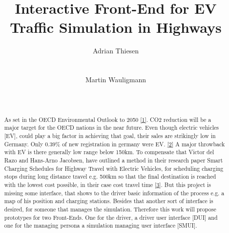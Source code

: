 \documentclass[hidelinks]{sig-alternate}
\begin{document}
\title{Interactive Front-End for EV Traffic Simulation in Highways}



\author{
\alignauthor Adrian Thiesen\\
       \\
       \\
\alignauthor Martin Wauligmann\\
       \\
       \\
}


\maketitle


\begin{abstract}

As set in the OECD Environmental Outlook to 2050 \href{https://www.oecd.org/env/cc/49082173.pdf}{[1]}. CO2 reduction
will be a major target for the OECD nations in the near future. Even though electric vehicles [EV], could play a big
factor in achieving that goal, their sales are strikingly low in Germany. Only 0.39\% of new registration in germany
were EV. \href{http://www.kba.de/DE/Statistik/Fahrzeuge/Neuzulassungen/neuzulassungen_node.html}{[2]} A major
throwback with EV is there generally low range below 150km. To compensate that Victor del Razo and Hans-Arno
Jacobsen, have outlined a method in their research paper Smart Charging Schedules for Highway Travel with Electric
Vehicles, for scheduling charging stops during long distance travel e.g. 500km  so that the final destination is
reached with the lowest cost possible, in their case cost travel time \href{https://www.i13.in.tum
.de/fileadmin/w00bof/www/PDF/TTE_2016.pdf}{[3}]. But this project is missing some interface, that shows to the driver
basic information of the process e.g. a map of his position and charging stations. Besides that another sort of
interface is desired, for someone that manages the simulation. Therefore this work will propose prototypes
for two Front-Ends. One for the driver, a driver user interface [DUI] and one for the managing persona a simulation
managing user interface [SMUI].

\end{abstract}
\end{document}
